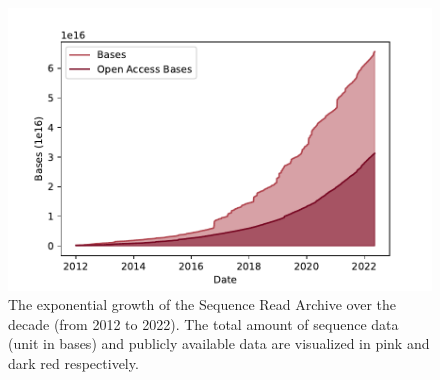 \begin{figure}[htbp]
  \centering
  \includegraphics[width=\textwidth]{images/sra_stat.pdf}
  \caption{The exponential growth of the Sequence Read Archive over the decade (from 2012 to 2022).
The total amount of sequence data (unit in bases) and publicly available data are visualized in pink and dark red respectively.}
  \label{fig:sra_stat}
\end{figure}
